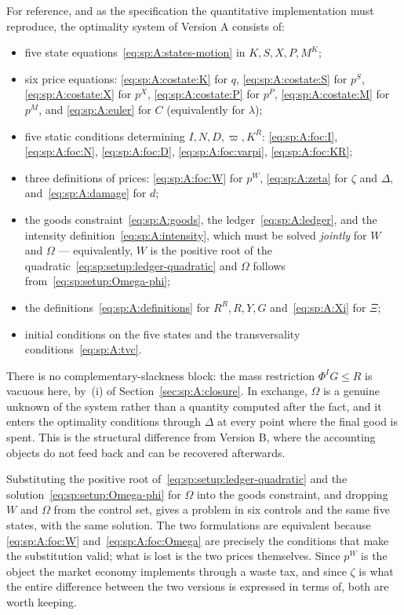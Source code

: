 For reference, and as the specification the quantitative implementation must reproduce, the
optimality system of Version A consists of:
\begin{itemize}[leftmargin=1.6em,itemsep=0.15em]
\item five state equations~\eqref{eq:sp:A:states-motion} in $K,S,X,P,M^K$;
\item six price equations: \eqref{eq:sp:A:costate:K} for $q$, \eqref{eq:sp:A:costate:S} for $p^S$,
\eqref{eq:sp:A:costate:X} for $p^X$, \eqref{eq:sp:A:costate:P} for $p^P$, \eqref{eq:sp:A:costate:M}
for $p^M$, and \eqref{eq:sp:A:euler} for $C$ (equivalently for $\lambda$);
\item five static conditions determining $I,N,D,\varpi,K^R$: \eqref{eq:sp:A:foc:I},
\eqref{eq:sp:A:foc:N}, \eqref{eq:sp:A:foc:D}, \eqref{eq:sp:A:foc:varpi}, \eqref{eq:sp:A:foc:KR};
\item three definitions of prices: \eqref{eq:sp:A:foc:W} for $p^W$, \eqref{eq:sp:A:zeta} for $\zeta$
and $\Delta$, and~\eqref{eq:sp:A:damage} for $d$;
\item the goods constraint~\eqref{eq:sp:A:goods}, the ledger~\eqref{eq:sp:A:ledger}, and the intensity
definition~\eqref{eq:sp:A:intensity}, which must be solved \emph{jointly} for $W$ and $\Omega$ ---
equivalently, $W$ is the positive root of the quadratic~\eqref{eq:sp:setup:ledger-quadratic} and
$\Omega$ follows from~\eqref{eq:sp:setup:Omega-phi};
\item the definitions~\eqref{eq:sp:A:definitions} for $R^R,R,Y,G$ and~\eqref{eq:sp:A:Xi} for $\Xi$;
\item initial conditions on the five states and the transversality conditions~\eqref{eq:sp:A:tvc}.
\end{itemize}
There is no complementary-slackness block: the mass restriction $\Phi^IG\le R$ is vacuous here, by~(i)
of Section~\ref{sec:sp:A:closure}. In exchange, $\Omega$ is a genuine unknown of the system rather than
a quantity computed after the fact, and it enters the optimality conditions through $\Delta$ at every
point where the final good is spent. This is the structural difference from Version B, where the
accounting objects do not feed back and can be recovered afterwards.

\begin{remark}\label{rem:sp:A:reduced}
Substituting the positive root of~\eqref{eq:sp:setup:ledger-quadratic} and the
solution~\eqref{eq:sp:setup:Omega-phi} for $\Omega$ into the goods constraint, and dropping $W$ and
$\Omega$ from the control set, gives a problem in six controls and the same five states, with the same
solution. The two formulations are equivalent because \eqref{eq:sp:A:foc:W} and~\eqref{eq:sp:A:foc:Omega}
are precisely the conditions that make the substitution valid; what is lost is the two prices
themselves. Since $p^W$ is the object the market economy implements through a waste tax, and since
$\zeta$ is what the entire difference between the two versions is expressed in terms of, both are
worth keeping.
\end{remark}

